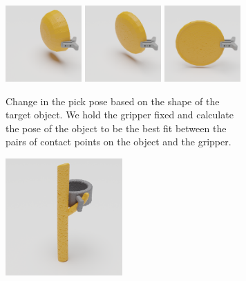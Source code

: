 \documentclass{article}
\begin{document}
\begin{figure}
    \begin{subfigure}[b]{0.6\textwidth}
        \centering
        \includegraphics[width=0.32\textwidth]{figures/blender/warp4/3.png}
        \includegraphics[width=0.32\textwidth]{figures/blender/warp4/4.png}
        \includegraphics[width=0.32\textwidth]{figures/blender/warp4/5.png}
        \caption{Change in the pick pose based on the shape of the target object. We hold the gripper fixed and calculate the pose of the object to be the best fit between the pairs of contact points on the object and the gripper.}
        \label{fig:pick_warps}
    \end{subfigure}
    \hspace{0.01\textwidth}
    \begin{subfigure}[b]{0.39\textwidth}
        \centering
        \includegraphics[width=0.49\textwidth]{figures/blender/warp2/mug_tree_2.png}

\end{subfigure}
\end{figure}
\end{document}
